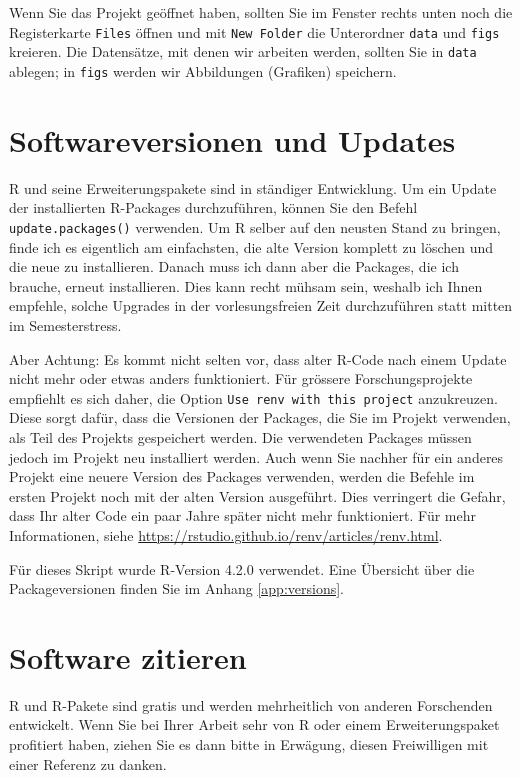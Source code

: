 \documentclass[oneside, 10pt]{book}\usepackage[]{graphicx}\usepackage[]{xcolor}
\begin{document}
Wenn Sie das Projekt geöffnet haben,
sollten Sie im Fenster rechts unten noch die Registerkarte
\texttt{Files} öffnen und mit \texttt{New Folder}
die Unterordner \texttt{data} und \texttt{figs} kreieren.
Die Datensätze, mit denen wir arbeiten werden, sollten Sie
in \texttt{data} ablegen; 
in \texttt{figs} werden wir Abbildungen (Grafiken) speichern.

\section{Softwareversionen und Updates}
R und seine Erweiterungspakete sind in ständiger Entwicklung.
Um ein Update der installierten R-Packages durchzuführen,
können Sie den Befehl \texttt{update.packages()} verwenden.
Um R selber auf den neusten Stand zu bringen, finde ich es
eigentlich am einfachsten, die alte Version komplett zu löschen
und die neue zu installieren. Danach muss ich dann aber die
Packages, die ich brauche, erneut installieren.
Dies kann recht mühsam sein, weshalb ich Ihnen empfehle,
solche Upgrades in der vorlesungsfreien Zeit durchzuführen
statt mitten im Semesterstress.

Aber Achtung: Es kommt nicht selten vor, dass alter R-Code
nach einem Update nicht mehr oder etwas anders funktioniert.
Für grössere Forschungsprojekte empfiehlt es sich daher,
die Option \texttt{Use renv with this project} anzukreuzen.
Diese sorgt dafür, dass die Versionen der Packages, die Sie 
im Projekt verwenden, als Teil des Projekts gespeichert werden.
Die verwendeten Packages müssen jedoch im Projekt neu installiert werden.
Auch wenn Sie nachher für ein anderes Projekt eine neuere
Version des Packages verwenden, werden die Befehle im ersten Projekt
noch mit der alten Version ausgeführt. Dies verringert die 
Gefahr, dass Ihr alter Code ein paar Jahre später nicht mehr funktioniert.
Für mehr Informationen, siehe \url{https://rstudio.github.io/renv/articles/renv.html}.

Für dieses Skript wurde R-Version 4.2.0 verwendet.
Eine Übersicht über die Packageversionen finden Sie im Anhang \ref{app:versions}.

\section{Software zitieren}
R und R-Pakete sind gratis und werden mehrheitlich
von anderen Forschenden entwickelt. Wenn Sie bei
Ihrer Arbeit sehr von R oder einem Erweiterungspaket
profitiert haben, ziehen Sie es dann bitte in Erwägung,
diesen Freiwilligen mit einer Referenz zu danken.
\end{document}
